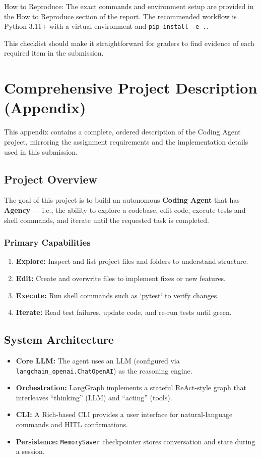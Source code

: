\documentclass[12pt, a4paper]{article}
\begin{document}
How to Reproduce: The exact commands and environment setup are provided in the How to Reproduce section of the report. The recommended workflow is Python 3.11+ with a virtual environment and \texttt{pip install -e .}.

This checklist should make it straightforward for graders to find evidence of each required item in the submission.

\section{Comprehensive Project Description (Appendix)}
This appendix contains a complete, ordered description of the Coding Agent project, mirroring the assignment requirements and the implementation details used in this submission.

\subsection{Project Overview}
The goal of this project is to build an autonomous \textbf{Coding Agent} that has \textbf{Agency} — i.e., the ability to explore a codebase, edit code, execute tests and shell commands, and iterate until the requested task is completed.

\subsubsection*{Primary Capabilities}
\begin{enumerate}
  \item \textbf{Explore:} Inspect and list project files and folders to understand structure.
  \item \textbf{Edit:} Create and overwrite files to implement fixes or new features.
  \item \textbf{Execute:} Run shell commands such as `pytest` to verify changes.
  \item \textbf{Iterate:} Read test failures, update code, and re-run tests until green.
\end{enumerate}

\subsection{System Architecture}
\begin{itemize}
  \item \textbf{Core LLM:} The agent uses an LLM (configured via \texttt{langchain\_openai.ChatOpenAI}) as the reasoning engine.
  \item \textbf{Orchestration:} LangGraph implements a stateful ReAct-style graph that interleaves ``thinking'' (LLM) and ``acting'' (tools).
  \item \textbf{CLI:} A Rich-based CLI provides a user interface for natural-language commands and HITL confirmations.
  \item \textbf{Persistence:} \texttt{MemorySaver} checkpointer stores conversation and state during a session.
\end{itemize}
\end{document}
